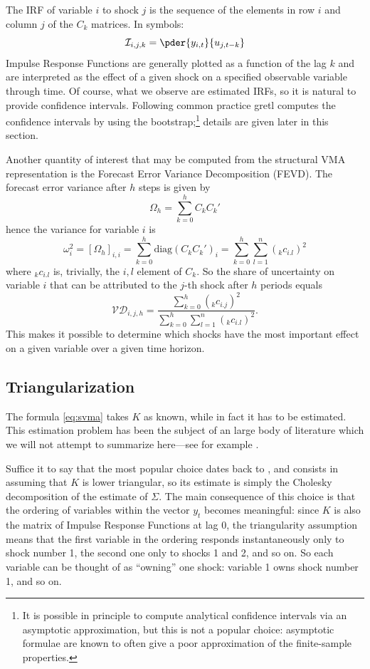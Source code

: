 The IRF of variable $i$ to shock $j$ is the sequence of the elements in
row $i$ and column $j$ of the $C_k$ matrices. In symbols:
\[
  \mathcal{I}_{i,j,k} = \pder{y_{i,t}}{u_{j, t-k}}
\]
Impulse Response Functions are generally plotted as a function of the
lag $k$ and are interpreted as the effect of a given shock on a
specified observable variable through time. Of course, what we observe
are estimated IRFs, so it is natural to provide confidence intervals.
Following common practice gretl computes the confidence intervals by
using the bootstrap;\footnote{It is possible in principle to compute
  analytical confidence intervals via an asymptotic approximation, but
  this is not a popular choice: asymptotic formulae are known to often
  give a poor approximation of the finite-sample properties.}  details
are given later in this section.

Another quantity of interest that may be computed from the structural
VMA representation is the Forecast Error Variance Decomposition
(FEVD). The forecast error variance after $h$ steps is given by
\[
  \Omega_h = \sum_{k=0}^h C_k C_k'
\]
hence the variance for variable $i$ is
\[
  \omega^2_i = \left[ \Omega_h \right]_{i,i} = \sum_{k=0}^h
  \mathrm{diag}(C_k C_k')_i =
  \sum_{k=0}^h \sum_{l=1}^n ({}_kc_{i.l})^2 
\]
where ${}_kc_{i.l}$ is, trivially, the $i,l$ element of $C_k$. So the
share of uncertainty on variable $i$ that can be attributed to the
$j$-th shock after $h$ periods equals
\[
  \mathcal{VD}_{i,j,h} =
  \frac{\sum_{k=0}^h ({}_kc_{i.j})^2 }{  \sum_{k=0}^h \sum_{l=1}^n
    ({}_kc_{i.l})^2 } .
\]
This makes it possible to determine which shocks have the most important
effect on a given variable over a given time horizon.

\subsection{Triangularization}

The formula \ref{eq:svma} takes $K$ as known, while in fact it has to be
estimated. This estimation problem has been the subject of an large body
of literature which we will not attempt to summarize here---see for
example \cite[chapter 9]{Lutkepohl05}.

Suffice it to say that the most popular choice dates back to
\cite{sims80}, and consists in assuming that $K$ is lower triangular, so
its estimate is simply the Cholesky decomposition of the estimate of
$\Sigma$. The main consequence of this choice is that the ordering of
variables within the vector $y_t$ becomes meaningful: since $K$ is also
the matrix of Impulse Response Functions at lag 0, the triangularity
assumption means that the first variable in the ordering responds
instantaneously only to shock number 1, the second one only to shocks 1
and 2, and so on. So each variable can be thought of as ``owning''
one shock: variable 1 owns shock number 1, and so on.

